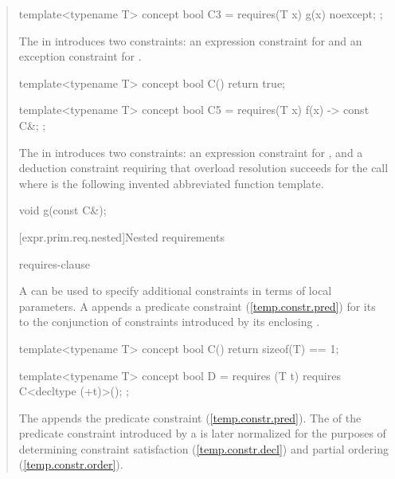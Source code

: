 \begin{quote}
\begin{codeblock}
template<typename T> concept bool C3 =
  requires(T x) {
    {g(x)} noexcept;
  };
\end{codeblock}

The  in  
introduces two constraints: an expression constraint for  
and an exception constraint for .

\begin{codeblock}
template<typename T> concept bool C() { return true; }

template<typename T> concept bool C5 =
  requires(T x) {
    {f(x)} -> const C&;
  };
\end{codeblock}

The  in  
introduces two constraints: an expression constraint for , 
and a deduction constraint requiring that overload resolution succeeds for the
call  where  is the following
invented abbreviated function template.
\begin{codeblock}
void g(const C&);
\end{codeblock}
\exitexample


[expr.prim.req.nested]{Nested requirements}

\begin{bnf}
\br
    requires-clause \terminal{;}
  \end{bnf}

\pnum
A  can be used
to specify additional constraints in terms of local parameters.
%
A  appends a predicate constraint 
(\ref{temp.constr.pred}) for its  
to the conjunction of constraints introduced by its enclosing
.
% 
\enterexample
\begin{codeblock}
template<typename T> concept bool C() { return sizeof(T) == 1; }

template<typename T> concept bool D =
  requires (T t) {
    requires C<decltype (+t)>();
  };
\end{codeblock}
The  appends the predicate constraint 
 (\ref{temp.constr.pred}).
\exitexample
%
\enternote
The  of the predicate constraint 
introduced by a  is later normalized 
for the purposes of determining constraint satisfaction (\ref{temp.constr.decl}) 
and partial ordering (\ref{temp.constr.order}).
\exitnote

\end{quote}
